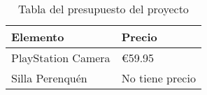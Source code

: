 \begin{table}[!ht]
\begin{center}
\begin{tabular}{|p{80mm}|p{40mm}|} \hline 
\textbf{Elemento } & \textbf{Precio} \\ \hline
PlayStation Camera &
\euro{59.95}
\\
\hline

Silla Perenquén &
No tiene precio
\\
\hline

\end{tabular}
\end{center}
\caption{Tabla del presupuesto del proyecto}
\label{table:resOthers}
\end{table}

